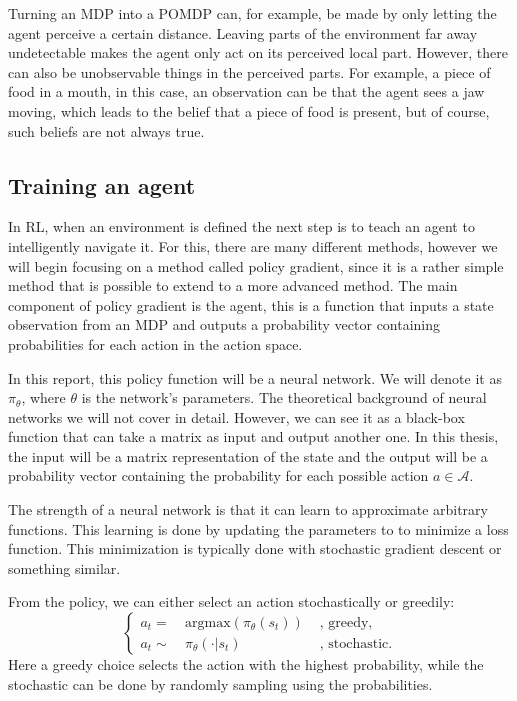 \documentclass[12pt,A4]{report}
\theoremstyle{definition}
\begin{document}
Turning an MDP into a POMDP can, for example, be made by only letting the agent perceive a certain distance. Leaving parts of the environment far away undetectable makes the agent only act on its perceived local part. However, there can also be unobservable things in the perceived parts. For example, a piece of food in a mouth, in this case, an observation can be that the agent sees a jaw moving, which leads to the belief that a piece of food is present, but of course, such beliefs are not always true. 


\subsection{Training an agent}

In RL, when an environment is defined the next step is to teach an agent to intelligently navigate it. For this, there are many different methods, however we will begin focusing on a method called policy gradient, since it is a rather simple method that is possible to extend to a more advanced method. The main component of policy gradient is the agent, this is a function that inputs a state observation from an MDP and outputs a probability vector containing probabilities for each action in the action space. 

In this report, this policy function will be a neural network. We will denote it as $\pi_\theta$, where $\theta$ is the network's parameters. The theoretical background of neural networks we will not cover in detail. However, we can see it as a black-box function that can take a matrix as input and output another one. In this thesis, the input will be a matrix representation of the state and the output will be a probability vector containing the probability for each possible action $a \in \mathcal{A}$. 

The strength of a neural network is that it can learn to approximate arbitrary functions. This learning is done by updating the parameters to to minimize a loss function. This minimization is typically done with stochastic gradient descent or something similar.  

From the policy, we can either select an action stochastically or greedily:
\begin{equation*}
  \left\{ 
  \begin{aligned}
    a_t =& \ \text{argmax}(\pi_\theta(s_t))& \text{ , greedy,} \\
    a_t \sim& \ \pi_\theta(\cdot | s_t)& \text{ , stochastic}.
  \end{aligned}
  \right.
\end{equation*}
Here a greedy choice selects the action with the highest probability, while the stochastic can be done by randomly sampling using the probabilities. 
\end{document}
